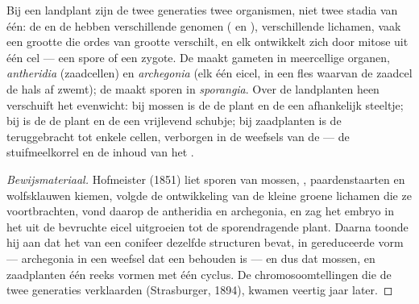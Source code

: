 \begin{proposition}\label{prop:b2:plant-life-cycles:alternation}
Bij een landplant zijn de twee generaties twee organismen, niet twee
stadia van één: de  en de  hebben verschillende
genomen ( en ), verschillende lichamen, vaak een grootte
die ordes van grootte verschilt, en elk ontwikkelt zich door mitose uit
één cel --- een spore of een zygote. De  maakt gameten in
meercellige organen, \emph{antheridia} (zaadcellen) en \emph{archegonia}
(elk één eicel, in een fles waarvan de zaadcel de hals af zwemt); de
 maakt sporen in \emph{sporangia}. Over de landplanten heen
verschuift het evenwicht: bij mossen is de  de plant en de
 een afhankelijk steeltje; bij  is de  de plant en
de  een vrijlevend schubje; bij zaadplanten is de 
teruggebracht tot enkele cellen, verborgen in de weefsels van de
 --- de stuifmeelkorrel en de inhoud van het .
\end{proposition}
\begin{proof}[Bewijsmateriaal]
Hofmeister (1851) liet sporen van mossen, , paardenstaarten en
wolfsklauwen kiemen, volgde de ontwikkeling van de kleine groene
lichamen die ze voortbrachten, vond daarop de antheridia en archegonia,
en zag het embryo in het  uit de bevruchte eicel uitgroeien
tot de sporendragende plant. Daarna toonde hij aan dat het 
van een conifeer dezelfde structuren bevat, in gereduceerde vorm ---
archegonia in een weefsel dat een behouden  is --- en dus dat
mossen,  en zaadplanten één reeks vormen met één cyclus. De
chromosoomtellingen die de twee generaties verklaarden (Strasburger,
1894), kwamen veertig jaar later.
\end{proof}

